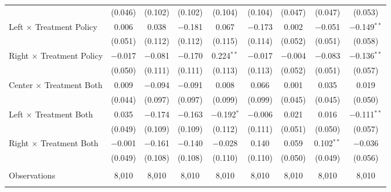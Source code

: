 \begin{tabular}{@{\extracolsep{5pt}}lcccccccc}
  & (0.046) & (0.102) & (0.102) & (0.104) & (0.104) & (0.047) & (0.047) & (0.053) \\ 
 Left $\times$ Treatment Policy & 0.006 & 0.038 & $-$0.181 & 0.067 & $-$0.173 & 0.002 & $-$0.051 & $-$0.149$^{**}$ \\ 
  & (0.051) & (0.112) & (0.112) & (0.115) & (0.114) & (0.052) & (0.051) & (0.058) \\ 
 Right $\times$ Treatment Policy & $-$0.017 & $-$0.081 & $-$0.170 & 0.224$^{**}$ & $-$0.017 & $-$0.004 & $-$0.083 & $-$0.136$^{**}$ \\ 
  & (0.050) & (0.111) & (0.111) & (0.113) & (0.113) & (0.052) & (0.051) & (0.057) \\ 
 Center $\times$ Treatment Both & 0.009 & $-$0.094 & $-$0.091 & 0.008 & 0.066 & 0.001 & 0.035 & 0.019 \\ 
  & (0.044) & (0.097) & (0.097) & (0.099) & (0.099) & (0.045) & (0.045) & (0.050) \\ 
 Left $\times$ Treatment Both & 0.035 & $-$0.174 & $-$0.163 & $-$0.192$^{*}$ & $-$0.006 & 0.021 & 0.016 & $-$0.111$^{**}$ \\ 
  & (0.049) & (0.109) & (0.109) & (0.112) & (0.111) & (0.051) & (0.050) & (0.057) \\ 
 Right $\times$ Treatment Both & $-$0.001 & $-$0.161 & $-$0.140 & $-$0.028 & 0.140 & 0.059 & 0.102$^{**}$ & $-$0.036 \\ 
  & (0.049) & (0.108) & (0.108) & (0.110) & (0.110) & (0.050) & (0.049) & (0.056) \\ 
\hline \\[-1.8ex] 

Observations & 8,010 & 8,010 & 8,010 & 8,010 & 8,010 & 8,010 & 8,010 & 8,010 \\ 
\hline 
\hline \\[-1.8ex] 
\end{tabular} 